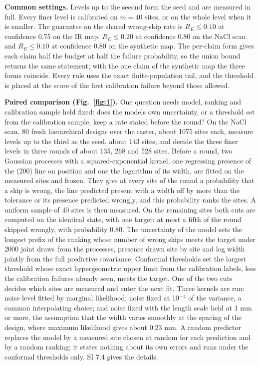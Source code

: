 \documentclass{iopjournal}
\begin{document}
\textbf{Common settings.} Levels up to the second form the seed and are measured in full. Every finer level is calibrated on \(m = 40\) sites, or on the whole level when it is smaller. The guarantee on the shared wrong-skip rate is \(R_E \le 0.10\) at confidence 0.75 on the IR map, \(R_E \le 0.20\) at confidence 0.80 on the NaCl scan and \(R_E \le 0.10\) at confidence 0.80 on the synthetic map. The per-claim form gives each claim half the budget at half the failure probability, so the union bound returns the same statement; with the one claim of the synthetic map the three forms coincide. Every rule uses the exact finite-population tail, and the threshold is placed at the score of the first calibration failure beyond those allowed.

\textbf{Paired comparison (Fig.~\ref{fig:1}).} One question needs model, ranking and calibration sample held fixed: does the model\textquotesingle s own uncertainty, or a threshold set from the calibration sample, keep a rate stated before the round? On the NaCl scan, 80 fresh hierarchical designs over the raster, about 1075 sites each, measure levels up to the third as the seed, about 143 sites, and decide the three finer levels in three rounds of about 135, 268 and 528 sites. Before a round, two Gaussian processes with a squared-exponential kernel, one regressing presence of the (200) line on position and one the logarithm of its width, are fitted on the measured sites and frozen. They give at every site of the round a probability that a skip is wrong, the line predicted present with a width off by more than the tolerance or its presence predicted wrongly, and this probability ranks the sites. A uniform sample of 40 sites is then measured. On the remaining sites both cuts are computed on the identical state, with one target: at most a fifth of the round skipped wrongly, with probability 0.80. The uncertainty of the model sets the longest prefix of the ranking whose number of wrong skips meets the target under 2000 joint draws from the processes, presence drawn site by site and log width jointly from the full predictive covariance. Conformal thresholds set the largest threshold whose exact hypergeometric upper limit from the calibration labels, less the calibration failures already seen, meets the target. One of the two cuts decides which sites are measured and enter the next fit. Three kernels are run: noise level fitted by marginal likelihood; noise fixed at 10\ensuremath{^{-}}\ensuremath{^{4}} of the variance, a common interpolating choice; and noise fixed with the length scale held at 1 mm or more, the assumption that the width varies smoothly at the spacing of the design, where maximum likelihood gives about 0.23 mm. A random predictor replaces the model by a measured site chosen at random for each prediction and by a random ranking; it states nothing about its own errors and runs under the conformal thresholds only. SI 7.4 gives the details.
\end{document}
